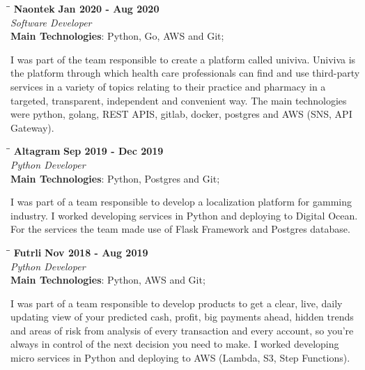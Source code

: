 \documentclass[margin]{res}
\begin{document}
\begin{resume}
\vspace{-0.1in}
   \begin{tabbing}
   \hspace{2.3in}\= \hspace{1.7in}\= \kill
    \textbf{Naontek}    \>\>\textbf{Jan 2020 - Aug 2020}\\
    \textit{Software Developer}\\        
    \textbf{Main Technologies}: Python, Go, AWS and Git;
   \end{tabbing}\vspace{-20pt}
    \vspace{2mm}
I was part of the team responsible to create a platform called univiva. Univiva is the platform
through which health care professionals can find and use third-party services in a variety of
topics relating to their practice and pharmacy in a targeted, transparent, independent and convenient way.
The main technologies were python, golang, REST APIS, gitlab, docker, postgres and AWS (SNS, API Gateway).

\vspace{-0.1in}
   \begin{tabbing}
   \hspace{2.3in}\= \hspace{1.7in}\= \kill
    \textbf{Altagram}    \>\>\textbf{Sep 2019 - Dec 2019}\\
    \textit{Python Developer}\\        
    \textbf{Main Technologies}: Python, Postgres and Git;
   \end{tabbing}\vspace{-20pt}
    \vspace{2mm}
I was part of a team responsible to develop a localization platform for gamming industry.
I worked developing services in Python and deploying to Digital Ocean. For the services the team
made use of Flask Framework and Postgres database.

\vspace{-0.1in}
   \begin{tabbing}
   \hspace{2.3in}\= \hspace{1.7in}\= \kill
    \textbf{Futrli}    \>\>\textbf{Nov 2018 - Aug 2019}\\
    \textit{Python Developer}\\        
    \textbf{Main Technologies}: Python, AWS and Git;
   \end{tabbing}\vspace{-20pt}
    \vspace{2mm}
I was part of a team responsible to develop products to get a clear, live, daily updating view of your predicted cash,
profit, big payments ahead, hidden trends and areas of risk from analysis of every transaction and every account,
so you’re always in control of the next decision you need to make.   
I worked developing micro services in Python and deploying to AWS (Lambda, S3, Step Functions).


\end{resume}
\end{document}
